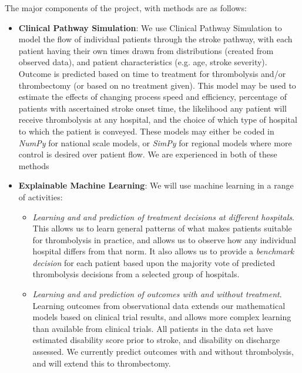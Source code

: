 The major components of the project, with methods are as follows:

\begin{itemize}

    \item \textbf{Clinical Pathway Simulation}: We use Clinical Pathway Simulation to model the flow of individual patients through the stroke pathway, with each patient having their own times drawn from distributions (created from observed data), and patient characteristics (e.g. age, stroke severity). Outcome is predicted based on time to treatment for thrombolysis and/or thrombectomy (or based on no treatment given). This model may be used to estimate the effects of changing process speed and efficiency, percentage of patients with ascertained stroke onset time, the likelihood any patient will receive thrombolysis at any hospital, and the choice of which type of hospital to which the patient is conveyed. These models may either be coded in \textit{NumPy} for national scale models, or \textit{SimPy} for regional models where more control is desired over patient flow. We are experienced in both of these methods \cite{allen_use_2022, allen_simulation_2020}

    \item \textbf{Explainable Machine Learning}: We will use machine learning in a range of activities:

    \begin{itemize}
        \item \textit{Learning and and prediction of treatment decisions at different hospitals}. This allows us to learn general patterns of what makes patients suitable for thrombolysis in practice, and allows us to observe how any individual hospital differs from that norm. It also allows us to provide a \textit{benchmark decision} for each patient based upon the majority vote of predicted thrombolysis decisions from a selected group of hospitals. 

        \item \textit{Learning and and prediction of outcomes with and without treatment}. Learning outcomes from observational data extends our mathematical models based on clinical trial results, and allows more complex learning than available from clinical trials. All patients in the data set have estimated disability score prior to stroke, and disability on discharge assessed. We currently predict outcomes with and without thrombolysis, and will extend this to thrombectomy.


\end{itemize}
\end{itemize}
